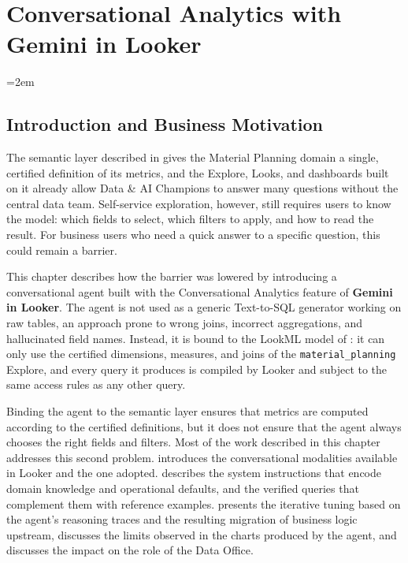 
\chapter{Conversational Analytics with Gemini in Looker}
\label{chap:conversational_agent}
\emergencystretch=2em %

\section[Introduction]{Introduction and Business Motivation}
\label{sec:agent_introduction}

The semantic layer described in  gives the Material Planning domain a single, certified definition of its metrics, and the Explore, Looks, and dashboards built on it already allow Data \& AI Champions to answer many questions without the central data team. Self-service exploration, however, still requires users to know the model: which fields to select, which filters to apply, and how to read the result. For business users who need a quick answer to a specific question, this could remain a barrier.

This chapter describes how the barrier was lowered by introducing a conversational agent built with the Conversational Analytics feature of \textbf{Gemini in Looker}. The agent is not used as a generic Text-to-SQL generator working on raw tables, an approach prone to wrong joins, incorrect aggregations, and hallucinated field names. Instead, it is bound to the LookML model of : it can only use the certified dimensions, measures, and joins of the \texttt{material\_planning} Explore, and every query it produces is compiled by Looker and subject to the same access rules as any other query.

Binding the agent to the semantic layer ensures that metrics are computed according to the certified definitions, but it does not ensure that the agent always chooses the right fields and filters. Most of the work described in this chapter addresses this second problem.  introduces the conversational modalities available in Looker and the one adopted.  describes the system instructions that encode domain knowledge and operational defaults, and  the verified queries that complement them with reference examples.  presents the iterative tuning based on the agent's reasoning traces and the resulting migration of business logic upstream,  discusses the limits observed in the charts produced by the agent, and  discusses the impact on the role of the Data Office.

